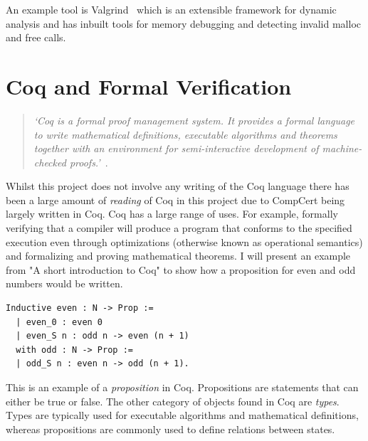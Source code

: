 An example tool is Valgrind~\cite{seward2005using} which is an extensible framework for dynamic analysis and has inbuilt tools for memory debugging and detecting invalid malloc and free calls.

\section{Coq and Formal Verification}

\begin{quotation}
    \textit{`Coq is a formal proof management system. It provides a formal language to write mathematical definitions, executable algorithms and theorems together with an environment for semi-interactive development of machine-checked proofs.'}~\cite{coq_website}.
\end{quotation}

Whilst this project does not involve any writing of the Coq language there has been a large amount of \textit{reading} of Coq in this project due to CompCert being largely written in Coq. Coq has a large range of uses. For example, formally verifying that a compiler will produce a program that conforms to the specified execution even through optimizations (otherwise known as operational semantics) and formalizing and proving mathematical theorems. I will present an example from "A short introduction to Coq"\cite{introduction-to-coq} to show how a proposition for even and odd numbers would be written.

\begin{lstlisting}[language=Coq, caption=Coq definition of even and odd numbers]
Inductive even : N -> Prop :=
  | even_0 : even 0
  | even_S n : odd n -> even (n + 1)
  with odd : N -> Prop :=
  | odd_S n : even n -> odd (n + 1).
\end{lstlisting}

This is an example of a \textit{proposition} in Coq. Propositions are statements that can either be true or false. The other category of objects found in Coq are \textit{types}. Types are typically used for executable algorithms and mathematical definitions, whereas propositions are commonly used to define relations between states.

